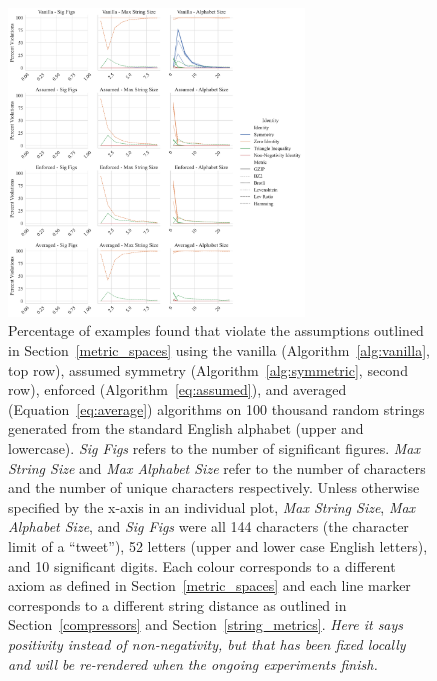 \documentclass[preprint,12pt]{article}
\newcommand{\cm}[1]{\textit{{\color{blue}#1}}}
\begin{document}
\begin{figure}[h!]
    \centering
    \includegraphics[width=0.70\textwidth]{images/synthetic_check.pdf}
    \caption{
    Percentage of examples found that violate the assumptions outlined in Section~\ref{metric_spaces} using the vanilla (Algorithm~\ref{alg:vanilla}, top row), assumed symmetry (Algorithm~\ref{alg:symmetric}, second row), enforced (Algorithm~\ref{eq:assumed}), and averaged (Equation~\ref{eq:average}) algorithms on 100 thousand random strings generated from the standard English alphabet (upper and lowercase). 
    \textit{Sig Figs} refers to the number of significant figures. \textit{Max String Size} and \textit{Max Alphabet Size} refer to the number of characters and the number of unique characters respectively. 
    Unless otherwise specified by the x-axis in an individual plot, \textit{Max String Size}, \textit{Max Alphabet Size}, and \textit{Sig Figs} were all 144 characters (the character limit of a ``tweet''), 52 letters (upper and lower case English letters), and 10 significant digits. Each colour corresponds to a different axiom as defined in Section~\ref{metric_spaces} and each line marker corresponds to a different string distance as outlined in Section~\ref{compressors} and Section~\ref{string_metrics}. \cm{Here it says positivity instead of non-negativity, but that has been fixed locally and will be re-rendered when the ongoing experiments finish.}
    }
    \label{fig:synthetic_check}
\end{figure}
\end{document}
